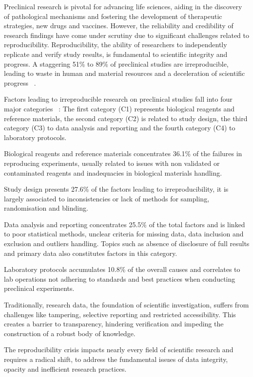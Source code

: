 Preclinical research is pivotal for advancing life sciences, aiding in the discovery of pathological mechanisms and fostering the development of therapeutic strategies, new drugs and vaccines. However, the reliability and credibility of research findings have come under scrutiny due to significant challenges related to reproducibility. Reproducibility, the ability of researchers to independently replicate and verify study results, is fundamental to scientific integrity and progress. A staggering 51\% to 89\% of preclinical studies are irreproducible, leading to waste in human and material resources and a deceleration of scientific progress ~\cite{freedman_economics_2015}.

Factors leading to irreproducible research on preclinical studies fall into four major categories ~\cite{freedman_economics_2015}: The first category (C1) represents biological reagents and reference materials, the second category (C2) is related to study design, the third category (C3) to data analysis and reporting and the fourth category (C4) to laboratory protocols.

Biological reagents and reference materials concentrates 36.1\% of the failures in reproducing experiments, usually related to issues with non validated or contaminated reagents and inadequacies in biological materials handling. 

Study design presents 27.6\% of the factors leading to irreproducibility, it is largely associated to inconsistencies or lack of methods for sampling, randomisation and blinding. 

Data analysis and reporting concentrates 25.5\% of the total factors and is linked to poor statistical methods, unclear criteria for missing data, data inclusion and exclusion and outliers handling. Topics such as absence of disclosure of full results and primary data also constitutes factors in this category. 

Laboratory protocols accumulates 10.8\% of the overall causes and correlates to lab operations not adhering to standards and best practices when conducting preclinical experiments.

Traditionally, research data, the foundation of scientific investigation, suffers from challenges like tampering, selective reporting and restricted accessibility. This creates a barrier to transparency, hindering verification and impeding the construction of a robust body of knowledge.

The reproducibility crisis impacts nearly every field of scientific research and requires a radical shift, to address the fundamental issues of data integrity, opacity and inefficient research practices.

